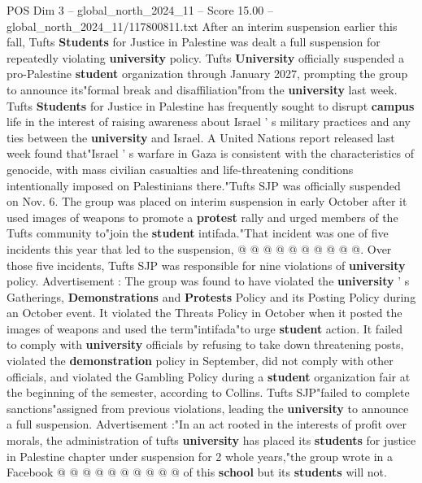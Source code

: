 \begin{textsample}{POS Dim 3 – global\_north\_2024\_11 – Score 15.00 – global\_north\_2024\_11/117800811.txt}  \label{ex:f3_pos_171}
After an interim suspension earlier this fall, Tufts \textbf{Students} for Justice in Palestine was dealt a full suspension for repeatedly violating \textbf{university} policy.
Tufts \textbf{University} officially suspended a pro-Palestine \textbf{student} organization through January 2027, prompting the group to announce its"formal break and disaffiliation"from the \textbf{university} last week.
Tufts \textbf{Students} for Justice in Palestine has frequently sought to disrupt \textbf{campus} life in the interest of raising awareness about Israel ' s military practices and any ties between the \textbf{university} and Israel.
A United Nations report released last week found that"Israel ' s warfare in Gaza is consistent with the characteristics of genocide, with mass civilian casualties and life-threatening conditions intentionally imposed on Palestinians there."Tufts SJP was officially suspended on Nov. 6.
The group was placed on interim suspension in early October after it used images of weapons to promote a \textbf{protest} rally and urged members of the Tufts community to"join the \textbf{student} intifada."That incident was one of five incidents this year that led to the suspension, @ @ @ @ @ @ @ @ @ @.
Over those five incidents, Tufts SJP was responsible for nine violations of \textbf{university} policy.
Advertisement : The group was found to have violated the \textbf{university} ' s Gatherings, \textbf{Demonstrations} and \textbf{Protests} Policy and its Posting Policy during an October event.
It violated the Threats Policy in October when it posted the images of weapons and used the term"intifada"to urge \textbf{student} action.
It failed to comply with \textbf{university} officials by refusing to take down threatening posts, violated the \textbf{demonstration} policy in September, did not comply with other officials, and violated the Gambling Policy during a \textbf{student} organization fair at the beginning of the semester, according to Collins.
Tufts SJP"failed to complete sanctions"assigned from previous violations, leading the \textbf{university} to announce a full suspension.
Advertisement :"In an act rooted in the interests of profit over morals, the administration of tufts \textbf{university} has placed its \textbf{students} for justice in Palestine chapter under suspension for 2 whole years,"the group wrote in a Facebook @ @ @ @ @ @ @ @ @ @ of this \textbf{school} but its \textbf{students} will not.

\end{textsample}
